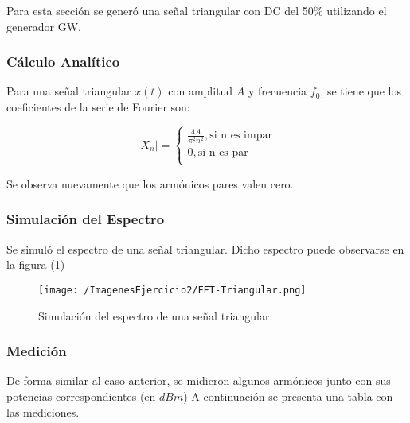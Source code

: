 Para esta sección se generó una señal triangular con DC del 50\% utilizando el generador GW.

\subsubsection{Cálculo Analítico}

Para una señal triangular $x(t)$ con amplitud $A$ y frecuencia $f_0$, se tiene que los coeficientes de la serie de Fourier son:

\begin{equation}
    |X_n|=
    \begin{cases}
                  \frac{4A}{\pi^2 n^2}, \text{si n es impar}\\ 
                  0, \text{si n es par} \\
     \end{cases}
\end{equation}

Se observa nuevamente que los armónicos pares valen cero. 

\subsubsection{Simulación del Espectro}

Se simuló el espectro de una señal triangular. Dicho espectro puede observarse en la figura (\ref{fig:simtriang})

\begin{figure}[H]
	\centering
	\texttt{[image: /ImagenesEjercicio2/FFT-Triangular.png]}
\caption{Simulación del espectro de una señal triangular.}
	\label{fig:simtriang}
\end{figure}


\subsubsection{Medición}

De forma similar al caso anterior, se midieron algunos armónicos junto con sus potencias correspondientes (en $dBm$) A continuación se presenta una tabla con las mediciones.



\begin{table}[H]
\end{table}

